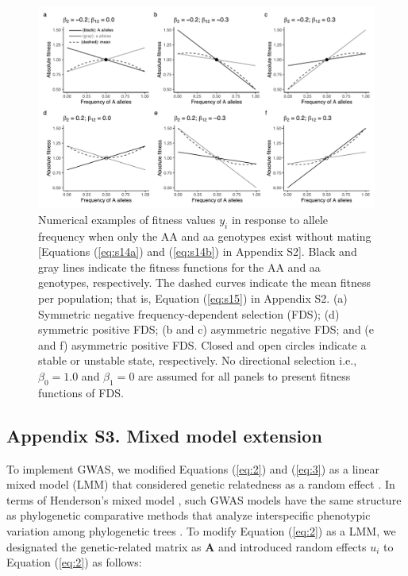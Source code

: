 \documentclass[12pt,]{article}
\begin{document}
\begin{figure}[ht]
  \includegraphics[width=0.95\linewidth]{AsymFDSinbred.pdf}
  \caption{Numerical examples of fitness values $y_i$ in response to allele frequency when only the AA and aa genotypes exist without mating [Equations (\ref{eq:s14a}) and (\ref{eq:s14b}) in Appendix S2]. Black and gray lines indicate the fitness functions for the AA and aa genotypes, respectively. The dashed curves indicate the mean fitness per population; that is, Equation (\ref{eq:s15}) in Appendix S2. (a) Symmetric negative frequency-dependent selection (FDS); (d) symmetric positive FDS; (b and c) asymmetric negative FDS; and (e and f) asymmetric positive FDS. Closed and open circles indicate a stable or unstable state, respectively. No directional selection i.e., $\beta_0=1.0$ and $\beta_1=0$ are assumed for all panels to present fitness functions of FDS.}
  \label{figS3:FDSinbred}
\end{figure}

\newpage
\clearpage
\medskip
\subsection*{Appendix S3. Mixed model extension}
To implement GWAS, we modified Equations (\ref{eq:2}) and (\ref{eq:3}) as a linear mixed model (LMM) that considered genetic relatedness as a random effect \citep{kang2008efficient}. In terms of Henderson's mixed model \citep{henderson1959estimation}, such GWAS models have the same structure as phylogenetic comparative methods that analyze interspecific phenotypic variation among phylogenetic trees \citep{kang2008efficient, hadfield2010general}. To modify Equation (\ref{eq:2}) as a LMM, we designated the genetic-related matrix as $\mathbf{A}$ and introduced random effects $u_i$ to Equation (\ref{eq:2}) as follows: 
\end{document}
